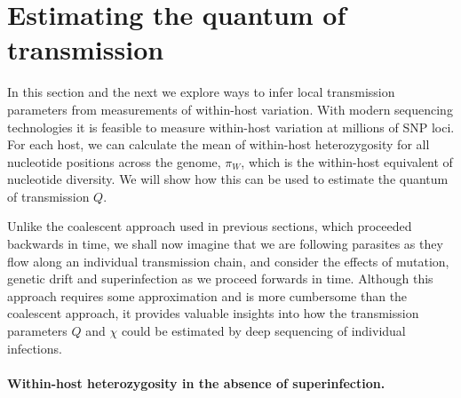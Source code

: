 \documentclass[_main.tex]{subfiles}
\begin{document}
\section*{Estimating the quantum of transmission}
\label{main_estimating_Q}

In this section and the next we explore ways to infer local transmission parameters from measurements of within-host variation.  With modern sequencing technologies it is feasible to measure within-host variation at millions of SNP loci.  For each host, we can calculate the mean of within-host heterozygosity for all nucleotide positions across the genome, $\pi_W$, which is the within-host equivalent of nucleotide diversity.  We will show how this can be used to estimate the quantum of transmission $Q$.

Unlike the coalescent approach used in previous sections, which proceeded backwards in time, we shall now imagine that we are following parasites as they flow along an individual transmission chain, and consider the effects of mutation, genetic drift and superinfection as we proceed forwards in time.  Although this approach requires some approximation and is more cumbersome than the coalescent approach, it provides valuable insights into how the transmission parameters $Q$ and $\chi$ could be estimated by deep sequencing of individual infections.

\paragraph{Within-host heterozygosity in the absence of superinfection.}  

\end{document}
